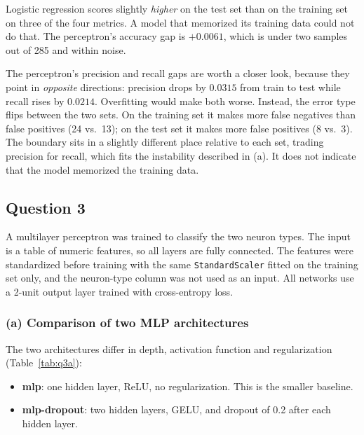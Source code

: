\documentclass[11pt]{article}
\begin{document}
Logistic regression scores slightly \emph{higher} on the test set than on the training set on three of the four metrics. A model that memorized its training data could not do that. The perceptron's accuracy gap is $+0.0061$, which is under two samples out of 285 and within noise.

The perceptron's precision and recall gaps are worth a closer look, because they point in \emph{opposite} directions: precision drops by $0.0315$ from train to test while recall rises by $0.0214$. Overfitting would make both worse. Instead, the error type flips between the two sets. On the training set it makes more false negatives than false positives (24 vs.\ 13); on the test set it makes more false positives (8 vs.\ 3). The boundary sits in a slightly different place relative to each set, trading precision for recall, which fits the instability described in (a). It does not indicate that the model memorized the training data.

\FloatBarrier
\subsection{Question 3}

A multilayer perceptron was trained to classify the two neuron types. The input is a table of numeric features, so all layers are fully connected. The features were standardized before training with the same \texttt{StandardScaler} fitted on the training set only, and the neuron-type column was not used as an input. All networks use a 2-unit output layer trained with cross-entropy loss.

\FloatBarrier
\subsubsection*{(a) Comparison of two MLP architectures}

The two architectures differ in depth, activation function and regularization (Table~\ref{tab:q3a}):
\begin{itemize}
    \item \textbf{mlp}: one hidden layer, ReLU, no regularization. This is the smaller baseline.
    \item \textbf{mlp-dropout}: two hidden layers, GELU, and dropout of 0.2 after each hidden layer.
\end{itemize}
\end{document}
